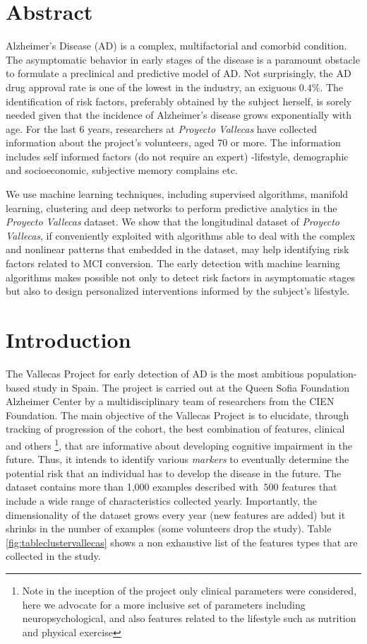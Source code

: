 \documentclass[11pt]{article}
\theoremstyle{definition}
\theoremstyle{remark}
\begin{document}
\section*{Abstract}
Alzheimer's Disease (AD) is a complex, multifactorial and comorbid condition. The asymptomatic behavior in early stages of the disease is a paramount obstacle to formulate a preclinical and predictive model of AD. Not surprisingly, the AD drug approval rate is one of the lowest in the industry, an exiguous $0.4\%$. The identification of risk factors, preferably obtained by the subject herself, is sorely needed given that the incidence of Alzheimer’s disease grows exponentially with age. 
For the last 6 years, researchers at \emph{Proyecto Vallecas} have collected information about the project's volunteers, aged 70 or more. The  information includes self informed factors (do not require an expert) -lifestyle, demographic and socioeconomic, subjective memory complains etc. 

We use machine learning techniques, including supervised algorithms, manifold learning, clustering and deep networks to perform predictive analytics in the \emph{Proyecto Vallecas} dataset.
We show that the longitudinal dataset of \emph{Proyecto Vallecas}, if conveniently exploited with algorithms able to deal with the complex and nonlinear patterns that embedded in the dataset, may help identifying risk factors related to MCI conversion.
The early detection with machine learning algorithms makes possible not only to detect risk factors in asymptomatic stages but also to design  personalized interventions informed by the subject's lifestyle.

\section{Introduction}

The Vallecas Project for early detection of AD is the most ambitious population-based study in Spain. The project is carried out at the Queen Sofia Foundation Alzheimer Center by a multidisciplinary team of researchers from the CIEN Foundation. The main objective of the Vallecas Project is to elucidate, through tracking of progression of the cohort, the best combination of features, clinical and others \footnote{Note in the inception of the project only clinical parameters were considered, here we advocate for a more inclusive set of parameters including neuropsychological, and also features related to the lifestyle such as nutrition and physical exercise}, that are informative about developing 
cognitive impairment in the future. Thus, it intends to identify various \emph{markers} to eventually determine the potential risk that an  individual has to develop the disease in the future. The dataset contains more than 1,000 examples described with $~500$ features that include a wide range of characteristics collected yearly. Importantly, the dimensionality of the dataset grows every year (new features are added) but it shrinks in the number of examples (some volunteers drop the study). Table \ref{fig:tableclustervallecas} shows a non exhaustive list of the features types that are collected in the study.
\end{document}
